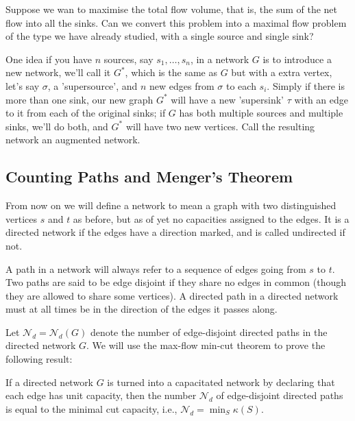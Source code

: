 \documentclass[10pt, a4paper]{article}
\begin{document}
Suppose we wan to maximise the total flow volume,
that is,
the sum of the net flow into all the sinks.
Can we convert this problem into a maximal flow problem of the type we have already studied,
with a single source and single sink?

One idea if you have $n$ sources,
say $s_1, \dotsc, s_n$,
in a network $G$ is to introduce a new network,
we'll call it $G ^ {*}$,
which is the same as $G$ but with a extra vertex,
let's say $\sigma$,
a 'supersource',
and $n$ new edges from $\sigma$ to each $s_i$.
Simply if there is more than one sink,
our new graph $G ^ {*}$ will have a new 'supersink' $\tau$ with an edge to it from each of the original sinks;
if $G$ has both multiple sources and multiple sinks,
we'll do both,
and $G ^ {*}$ will have two new vertices.
Call the resulting network an augmented network.

\subsection{Counting Paths and Menger's Theorem}
From now on we will define a network to mean a graph with two distinguished vertices $s$ and $t$ as before,
but as of yet no capacities assigned to the edges.
It is a directed network if the edges have a direction marked,
and is called undirected if not.

\begin{definition}
    A path in a network will always refer to a sequence of edges going from $s$ to $t$.
    Two paths are said to be edge disjoint if they share no edges in common
    (though they are allowed to share some vertices).
    A directed path in a directed network must at all times be in the direction of the edges it passes along.
\end{definition}

Let $\mathcal{N}_d = \mathcal{N}_d(G)$ denote the number of edge-disjoint directed paths in the directed network $G$.
We will use the max-flow min-cut theorem to prove the following result:

\begin{theorem}\label{sem:disc:thm:mincuteqnumdirected}
    If a directed network $G$ is turned into a capacitated network by declaring that each edge has unit capacity,
    then the number $\mathcal{N}_d$ of edge-disjoint directed paths is equal to the minimal cut capacity,
    i.e.,
    $\mathcal{N}_d = \min_{S}\kappa(S)$.
\end{theorem}
\end{document}
